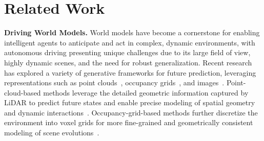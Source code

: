 \documentclass{article}
\begin{document}
\section{Related Work}

\textbf{Driving World Models.}
World models have become a cornerstone for enabling intelligent agents to anticipate and act in complex, dynamic environments, with autonomous driving presenting unique challenges due to its large field of view, highly dynamic scenes, and the need for robust generalization. Recent research has explored a variety of generative frameworks for future prediction, leveraging representations such as point clouds~\cite{fan2019pointrnn, lu2021monet, khurana2022differentiable, zhangcopilot4d, huang2025neural, zhang2024nerf, wu2023fast, huang2023neural, yang2024visual}, occupancy grids~\cite{liu2024lidar, bogdoll2023muvo, ma2024cam4docc, zheng2025occworld, gu2024dome, min2024driveworld, zuo2024gaussianworld, wei2024occllama, wang2024occsora, yan2024renderworld}, and images~\cite{wang2023drivedreamer, zhao2024drivedreamer, zhao2024drivedreamer4d, ni2024recondreamer, wang2024worlddreamer, doe, chi2024evaembodiedworldmodel}.
Point-cloud-based methods leverage the detailed geometric information captured by LiDAR to predict future states and enable precise modeling of spatial geometry and dynamic interactions~\cite{zhangcopilot4d, huang2025neural, zhang2024nerf}.
Occupancy-grid-based methods further discretize the environment into voxel grids for more fine-grained and geometrically consistent modeling of scene evolutions~\cite{ma2024cam4docc, zheng2025occworld, gu2024dome, min2024driveworld, zuo2024gaussianworld, wei2024occllama, wang2024occsora, yan2024renderworld}.
\end{document}
